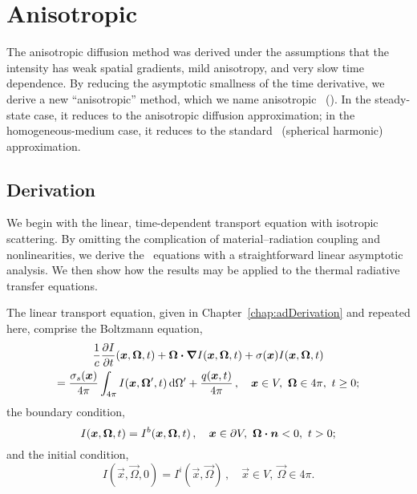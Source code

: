 
\chapter{Anisotropic \texorpdfstring{\Pone}{P1}}\label{chap:aponeDerivation}

The anisotropic diffusion method was derived under the assumptions that the
intensity has weak spatial gradients, mild anisotropy, and very slow time
dependence. By reducing the asymptotic smallness of the time derivative, we
derive a new ``anisotropic'' method, which we name anisotropic \Pone\ (\APone).
In the steady-state case, it reduces to the anisotropic diffusion approximation;
in
the homogeneous-medium case, it reduces to the standard \Pone\ (spherical
harmonic)
approximation. 

\section{Derivation}

We begin with the linear, time-dependent transport equation with isotropic
scattering. By omitting the complication of material--radiation coupling and
nonlinearities, we derive the \APone\ equations with a straightforward
linear asymptotic analysis. We then show how the results may be applied to
the thermal radiative transfer equations.

The linear transport equation, given in Chapter~\ref{chap:adDerivation}
and repeated here, comprise the Boltzmann equation,
\begin{multline} \label{eq:tdTransportVol_4}
  \frac{1}{c}\frac{\partial I}{\partial t}(\bm{x},\bm{\Omega},t)
  + \bm{\Omega}\bm{\cdot} \bm{\nabla} I(\bm{x},\bm{\Omega},t)
  + \sigma(\bm{x}) I(\bm{x},\bm{\Omega},t)
  \\ = \frac{\sigma_s(\bm{x})}{4\pi}
  \int_{4\pi} I(\bm{x},\bm{\Omega}',t) \mathop{}\!\mathrm{d} \Omega'
  + \frac{q(\bm{x},t)}{4\pi}
  \,, \quad \bm{x}\in V,\ \bm{\Omega}\in4\pi,\ t \ge 0;
\end{multline}
the boundary condition,
\begin{equation} \label{eq:tdTransportBndy_4}
  I(\bm{x},\bm{\Omega},t) = I^b(\bm{x},\bm{\Omega},t) \,,
  \quad \bm{x}\in \partial V ,\ \bm{\Omega}\bm{\cdot} \bm{n} < 0,\ t > 0;
\end{equation}
and the initial condition,
\begin{equation} \label{eq:tdTransportInit_4}
  I(\vec{x},\vec{\Omega},0) = I^i(\vec{x},\vec{\Omega}) \,,
  \quad \vec{x}\in V ,\ \vec{\Omega} \in 4\pi.
\end{equation}

